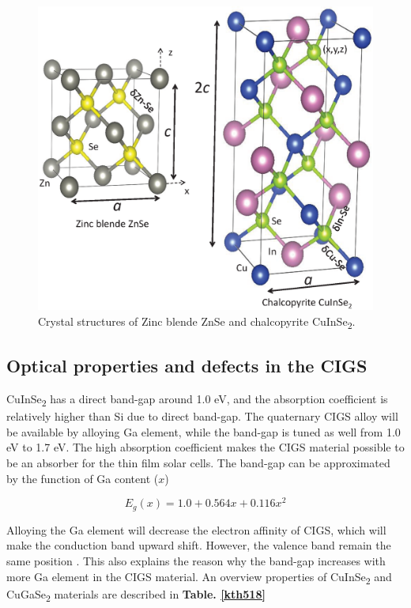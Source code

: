 \documentclass[a4paper, 12pt, titlepage,oneside,drop]{kthesis}
\begin{document}
\begin{figure}[H]
\centering
\includegraphics[scale=0.4]{structureciise.eps} 
\caption{Crystal structures of Zinc blende ZnSe and chalcopyrite CuInSe\textsubscript{2}.}
\label{crystal_cigs}
\end{figure}


\subsection{Optical properties and defects in the CIGS}
CuInSe\textsubscript{2} has a direct band-gap around 1.0 eV, and the absorption coefficient is relatively higher than Si due to direct band-gap. The quaternary CIGS alloy will be available by alloying Ga element, while the band-gap is tuned as well from 
1.0 eV to 1.7 eV. The high absorption coefficient makes the CIGS material possible to be an absorber for the thin film solar cells. The band-gap can be approximated by the function of Ga content ($x$) \cite{luque2011handbook}

\begin{equation}
E_g(x) = 1.0 + 0.564x+0.116x^2
\end{equation}

Alloying the Ga element will decrease the electron affinity of CIGS, which will make the conduction band upward shift. However, the valence band remain the same position \cite{jiang2004does}. This also explains the reason why the band-gap increases with 
more Ga element in the CIGS material. An overview properties of CuInSe\textsubscript{2} and CuGaSe\textsubscript{2} materials are described in \textbf{Table. \ref{kth518}} 
\end{document}
